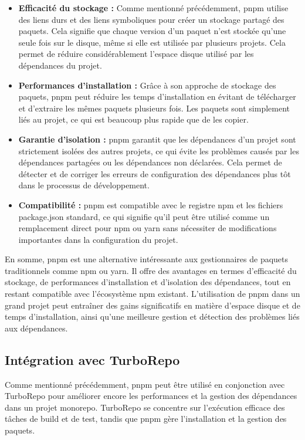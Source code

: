 \begin{itemize}
    \item \textbf{Efficacité du stockage :} Comme mentionné précédemment, pnpm utilise des liens durs et des liens symboliques pour créer un stockage partagé des paquets. Cela signifie que chaque version d'un paquet n'est stockée qu'une seule fois sur le disque, même si elle est utilisée par plusieurs projets. Cela permet de réduire considérablement l'espace disque utilisé par les dépendances du projet.
    \item \textbf{Performances d'installation :} Grâce à son approche de stockage des paquets, pnpm peut réduire les temps d'installation en évitant de télécharger et d'extraire les mêmes paquets plusieurs fois. Les paquets sont simplement liés au projet, ce qui est beaucoup plus rapide que de les copier.
    \item \textbf{Garantie d'isolation :} pnpm garantit que les dépendances d'un projet sont strictement isolées des autres projets, ce qui évite les problèmes causés par les dépendances partagées ou les dépendances non déclarées. Cela permet de détecter et de corriger les erreurs de configuration des dépendances plus tôt dans le processus de développement.
    \item \textbf{Compatibilité :} pnpm est compatible avec le registre npm et les fichiers package.json standard, ce qui signifie qu'il peut être utilisé comme un remplacement direct pour npm ou yarn sans nécessiter de modifications importantes dans la configuration du projet.
\end{itemize}

En somme, pnpm est une alternative intéressante aux gestionnaires de paquets traditionnels comme npm ou yarn. Il offre des avantages en termes d'efficacité du stockage, de performances d'installation et d'isolation des dépendances, tout en restant compatible avec l'écosystème npm existant. L'utilisation de pnpm dans un grand projet peut entraîner des gains significatifs en matière d'espace disque et de temps d'installation, ainsi qu'une meilleure gestion et détection des problèmes liés aux dépendances.

\subsection{Intégration avec TurboRepo}

Comme mentionné précédemment, pnpm peut être utilisé en conjonction avec TurboRepo pour améliorer encore les performances et la gestion des dépendances dans un projet monorepo. TurboRepo se concentre sur l'exécution efficace des tâches de build et de test, tandis que pnpm gère l'installation et la gestion des paquets.

